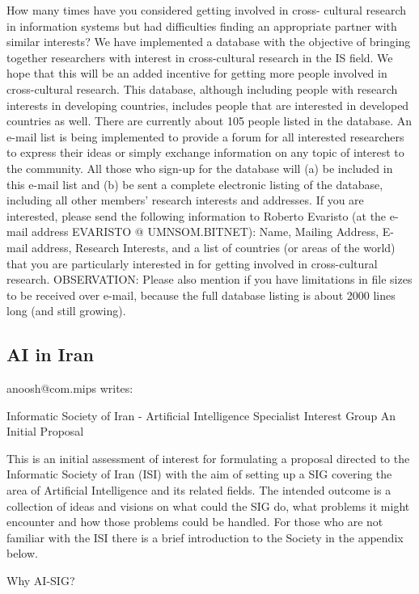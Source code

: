 How many times have you considered getting involved in cross-
cultural research in information systems but had difficulties
finding an appropriate partner with similar interests?
We have implemented a database with the objective of bringing
together researchers with interest in cross-cultural research in
the IS field.  We hope that this will be an added incentive for
getting more people involved in cross-cultural research.  This
database, although including people with research interests in
developing countries, includes people that are interested in
developed countries as well.  There are currently about 105 people
listed in the database.
An e-mail list is being implemented to provide a forum for all
interested researchers to express their ideas or simply exchange
information on any topic of interest to the community.  All those
who sign-up for the database will (a) be included in this e-mail
list and (b) be sent a complete electronic listing of the database,
including all other members' research interests and addresses.
If you are interested, please send the following information to
Roberto Evaristo (at the e-mail address EVARISTO @ UMNSOM.BITNET):
Name, Mailing Address, E-mail address, Research Interests, and a
list of countries (or areas of the world) that you are particularly
interested in for getting involved in cross-cultural research.
OBSERVATION:   Please also mention if you have limitations in file
sizes to be received over e-mail, because the full database listing
is about 2000 lines long (and still growing).

\subsection{AI in Iran}
anoosh@com.mips writes:

Informatic Society of Iran - Artificial Intelligence Specialist Interest Group
			An Initial Proposal

This is an initial assessment of interest for formulating a proposal directed
to the Informatic Society of Iran (ISI) with the aim of setting up a SIG 
covering the area of Artificial Intelligence and its related fields. The 
intended outcome is a collection of ideas and visions on what could the SIG 
do, what problems it might encounter and how those problems could be handled.
For those who are not familiar with the ISI there is a brief introduction to 
the Society in the appendix below.

Why AI-SIG?


